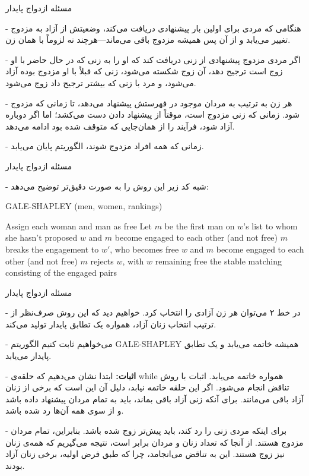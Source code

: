 \begin{itemframe}{مسئله ازدواج پایدار}
\item[-]
هنگامی که مردی برای اولین بار پیشنهادی دریافت می‌کند، وضعیتش از آزاد به مزدوج تغییر می‌یابد و از آن پس همیشه مزدوج باقی می‌ماند—هرچند نه لزوماً با همان زن.
\item[-]
 اگر مردی مزدوج پیشنهادی از زنی دریافت کند که او را به زنی که در حال حاضر با او زوج است ترجیح دهد، آن زوج شکسته می‌شود، زنی که قبلاً با او مزدوج بوده آزاد می‌شود، و مرد با زنی که بیشتر ترجیح داد زوج می‌شود.

\item[-]
هر زن به ترتیب به مردان موجود در فهرستش پیشنهاد می‌دهد، تا زمانی که مزدوج شود. زمانی که زنی مزدوج است، موقتاً از پیشنهاد دادن دست می‌کشد؛ اما اگر دوباره آزاد شود، فرآیند را از همان‌جایی که متوقف شده بود ادامه می‌دهد.
\item[-]
زمانی که همه افراد مزدوج شوند، الگوریتم پایان می‌یابد.
\end{itemframe}


\begin{itemframe}{مسئله ازدواج پایدار}
\item[-]
شبه کد زیر این روش را به صورت دقیق‌تر توضیح می‌دهد:
\begin{algorithm}[H]\alglr
\caption{GALE-SHAPLEY (men, women, rankings)}
\begin{algorithmic}[1]
\State Assign each woman and man as free
    \State Let $m$ be the first man on $w$’s list to whom she hasn't proposed
        \State $w$ and $m$ become engaged to each other (and not free)
        \State $m$ breaks the engagement to $w'$, who becomes free
        \State $w$ and $m$ become engaged to each other (and not free)
    \Else
        \State $m$ rejects $w$, with $w$ remaining free
    \EndIf
\EndWhile
\State \Return the stable matching consisting of the engaged pairs
\end{algorithmic}
\end{algorithm}

\end{itemframe}


\begin{itemframe}{مسئله ازدواج پایدار}
\item[-]
در خط ۲ می‌توان هر زن آزادی را انتخاب کرد. خواهیم دید که این روش صرف‌نظر از ترتیب انتخاب زنان آزاد، همواره یک تطابق پایدار تولید می‌کند.
\item[-]
‌می‌خواهیم ثابت کنیم الگوریتم GALE-SHAPLEY همیشه خاتمه می‌یابد و یک تطابق پایدار می‌یابد.
\item[-]
\textbf{اثبات:}
 ابتدا نشان می‌دهیم که حلقه‌ی while همواره خاتمه می‌یابد. اثبات با روش تناقض انجام می‌شود. اگر این حلقه خاتمه نیابد، دلیل آن این است که برخی از زنان آزاد باقی می‌مانند. برای آنکه زنی آزاد باقی بماند، باید به تمام مردان پیشنهاد داده باشد و از سوی همه آن‌ها رد شده باشد.
\item[-]
 برای اینکه مردی زنی را رد کند، باید پیش‌تر زوج شده باشد. بنابراین، تمام مردان مزدوج هستند. از آنجا که تعداد زنان و مردان برابر است، نتیجه می‌گیریم که همه‌ی زنان نیز زوج هستند. این به تناقض می‌انجامد، چرا که طبق فرض اولیه، برخی زنان آزاد بودند.
\end{itemframe}


